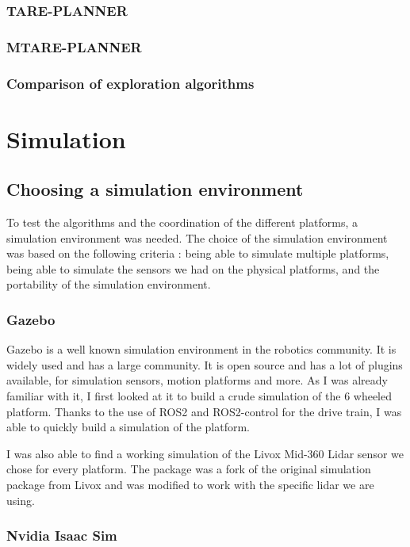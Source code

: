 \documentclass[11pt]{article}
\begin{document}
            \subsubsection{TARE-PLANNER}
            \subsubsection{MTARE-PLANNER}
            \subsubsection{Comparison of exploration algorithms}

    \newpage
    \section{Simulation}
        \subsection{Choosing a simulation environment}

            To test the algorithms and the coordination of the different platforms, a simulation environment was needed. The choice of the simulation environment was based on the following criteria : being able to simulate multiple platforms, being able to simulate the sensors we had on the physical platforms, and the portability of the simulation environment.


            \subsubsection{Gazebo}
                Gazebo is a well known simulation environment in the robotics community. It is widely used and has a large community. It is open source and has a lot of plugins available, for simulation sensors, motion platforms and more. As I was already familiar with it, I first looked at it to build a crude simulation of the 6 wheeled platform. Thanks to the use of ROS2 and ROS2-control for the drive train, I was able to quickly build a simulation of the platform. 

                I was also able to find a working simulation of the Livox Mid-360 Lidar sensor we chose for every platform. The package \cite{livox_lidar_simulation_fork} was a fork of the original simulation package from Livox \cite{livox_laser_simulation} and was modified to work with the specific lidar we are using. 
            \subsubsection{Nvidia Isaac Sim}
\end{document}

